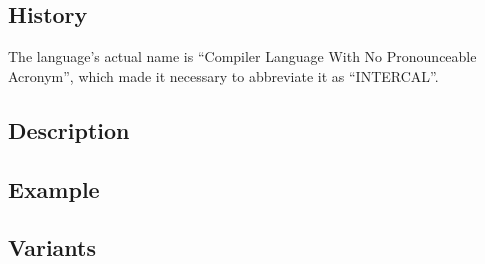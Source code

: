 \subsection{History}

The language's actual name is “Compiler Language With No Pronounceable Acronym”, which made it necessary to abbreviate it as “INTERCAL”.

\blindtext[5]

\subsection{Description}

\blindtext[5]

\subsection{Example}



\blindtext[5]

\subsection{Variants}

\blindtext[2]
